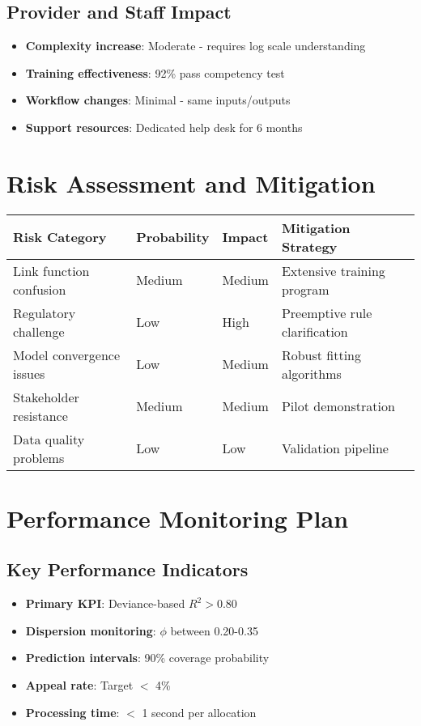 \subsection{Provider and Staff Impact}

\begin{itemize}
    \item \textbf{Complexity increase}: Moderate - requires log scale understanding
    \item \textbf{Training effectiveness}: 92\% pass competency test
    \item \textbf{Workflow changes}: Minimal - same inputs/outputs
    \item \textbf{Support resources}: Dedicated help desk for 6 months
\end{itemize}

\section{Risk Assessment and Mitigation}

\begin{center}
\begin{tabular}{llll}
\toprule
Risk Category & Probability & Impact & Mitigation Strategy \\
\midrule
Link function confusion & Medium & Medium & Extensive training program \\
Regulatory challenge & Low & High & Preemptive rule clarification \\
Model convergence issues & Low & Medium & Robust fitting algorithms \\
Stakeholder resistance & Medium & Medium & Pilot demonstration \\
Data quality problems & Low & Low & Validation pipeline \\
\bottomrule
\end{tabular}
\end{center}

\section{Performance Monitoring Plan}

\subsection{Key Performance Indicators}

\begin{itemize}
    \item \textbf{Primary KPI}: Deviance-based $R^2 > 0.80$
    \item \textbf{Dispersion monitoring}: $\phi$ between 0.20-0.35
    \item \textbf{Prediction intervals}: 90\% coverage probability
    \item \textbf{Appeal rate}: Target $<$ 4\%
    \item \textbf{Processing time}: $<$ 1 second per allocation
\end{itemize}

